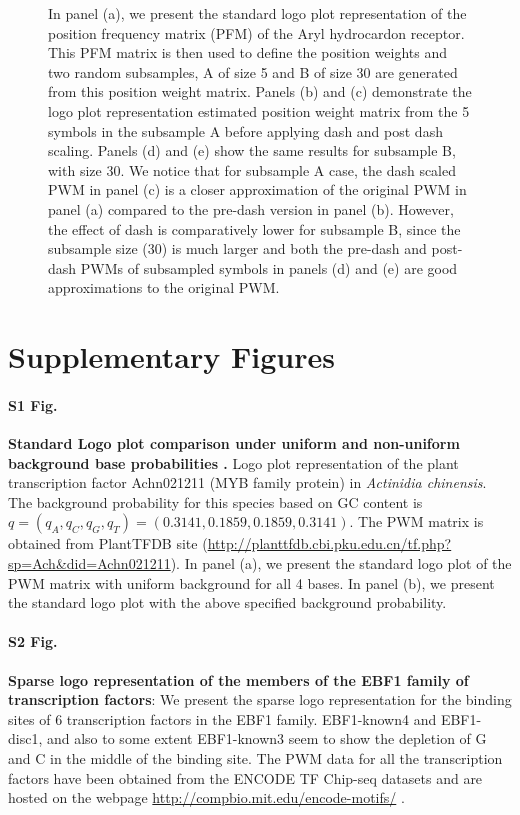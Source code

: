 \documentclass{bmcart}
\begin{document}
\begin{backmatter}
\begin{figure}[h!]
  \caption{
      In panel (a), we present the standard logo plot representation of the position frequency matrix (PFM) of the Aryl hydrocardon receptor. This PFM matrix is then used to define the position weights and two random subsamples, A of size 5 and B of size 30 are generated from this position weight matrix. Panels (b) and (c) demonstrate the logo plot representation estimated position weight matrix from the 5 symbols in the subsample A before applying dash and post dash scaling. Panels (d) and (e) show the same results for subsample B, with size 30. We notice that for subsample A case, the dash scaled PWM in panel (c) is a closer approximation of the original PWM in panel (a) compared to the pre-dash version in panel (b). However, the effect of dash is comparatively lower for subsample B, since the subsample size (30) is much larger and both the pre-dash and post-dash PWMs of subsampled symbols in panels (d) and (e) are good approximations to the original PWM.}
\label{fig:fig5}
\end{figure}



\newpage

\section*{Supplementary Figures}

\paragraph*{S1 Fig.}
\label{fig:suppfig1}
 \textbf{Standard Logo plot comparison under uniform and non-uniform background base probabilities .}
      Logo plot representation of the plant transcription factor Achn021211 (MYB family protein) in \textit{Actinidia chinensis}. The background probability for this species based on GC content is $q = \left (q_A, q_C, q_G, q_T \right) = \left (0.3141, 0.1859, 0.1859, 0.3141 \right )$. The PWM matrix is obtained from PlantTFDB site (\url{http://planttfdb.cbi.pku.edu.cn/tf.php?sp=Ach&did=Achn021211}). In panel (a), we present the standard logo plot of the PWM matrix with uniform background for all 4 bases. In panel (b), we present the standard logo plot with the above specified background probability.
      
      
\paragraph*{S2 Fig.}
\label{fig:suppfig2}
\textbf{Sparse logo representation of the members of the EBF1 family of transcription factors}: We present the sparse logo representation for the binding sites of 6 transcription factors in the EBF1 family. EBF1-known4 and EBF1-disc1, and also to some extent EBF1-known3 seem to show the depletion of G and C in the middle of the binding site. The PWM data for all the transcription factors have been obtained from the ENCODE TF Chip-seq datasets and are hosted on the webpage \url{http://compbio.mit.edu/encode-motifs/} \cite{Kheradpour2013}.   


\end{backmatter}
\end{document}
